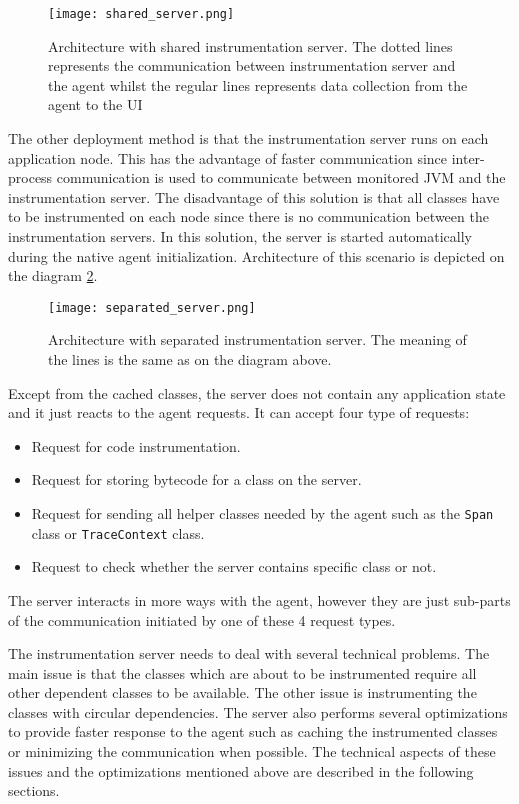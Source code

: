  \begin{figure}
 	\centering
 	\texttt{[image: shared\_server.png]}
 	\caption{Architecture with shared instrumentation server. The dotted lines represents the communication between instrumentation server and the agent whilst the regular lines represents data collection from the agent to the UI}
 	\label{fig:shared_server}
 \end{figure}
 
 The other deployment method is that the instrumentation server runs on each application node. This has the advantage of faster communication since  inter-process communication is used to communicate between monitored JVM and the instrumentation server. The disadvantage of this solution is that all classes have to be instrumented on each node since there is no communication between the instrumentation servers. In this solution, the server is started automatically during the native agent initialization. Architecture of this scenario is depicted on the diagram \ref{fig:separated_server}.
 
 \begin{figure}
 	\centering
 	\texttt{[image: separated\_server.png]}
 	\caption{Architecture with separated instrumentation server. The meaning of the lines is the same as on the diagram above.}
 	\label{fig:separated_server}
 \end{figure}

Except from the cached classes, the server does not contain any application state and it just reacts to the agent requests. It can accept four type of requests:
\begin{itemize}
	\item Request for code instrumentation.
	\item Request for storing bytecode for a class on the server.
	\item Request for sending all helper classes needed by the agent such as the \texttt{Span} class or \texttt{TraceContext} class.
	\item Request to check whether the server contains specific class or not.
\end{itemize}
The server interacts in more ways with the agent, however they are just sub-parts of the communication initiated by one of these 4 request types.	

The instrumentation server needs to deal with several technical problems. The main issue is that the classes which are about to be instrumented require all other dependent classes to be available. The other issue is instrumenting the classes with circular dependencies. The server also performs several optimizations to provide faster response to the agent such as caching the instrumented classes or minimizing the communication when possible. The technical aspects of these issues and the optimizations mentioned above are described in the following sections.
